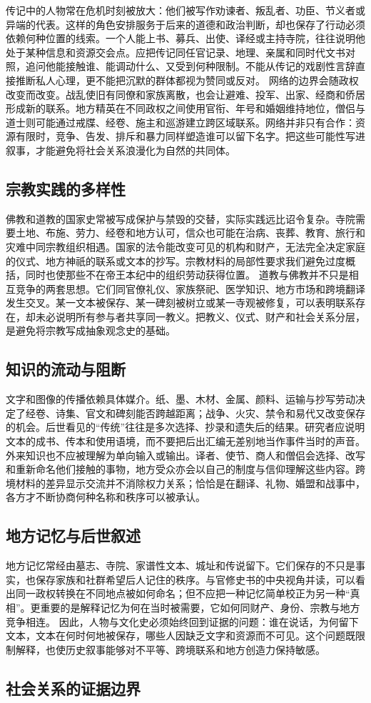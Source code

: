 传记中的人物常在危机时刻被放大：他们被写作劝谏者、叛乱者、功臣、节义者或异端的代表。这样的角色安排服务于后来的道德和政治判断，却也保存了行动必须依赖何种位置的线索。一个人能上书、募兵、出使、译经或主持寺院，往往说明他处于某种信息和资源交会点。应把传记同任官记录、地理、亲属和同时代文书对照，追问他能接触谁、能调动什么、又受到何种限制。不能从传记的戏剧性言辞直接推断私人心理，更不能把沉默的群体都视为赞同或反对。  网络的边界会随政权改变而改变。战乱使旧有同僚和家族离散，也会让避难、投军、出家、经商和侨居形成新的联系。地方精英在不同政权之间使用官衔、年号和婚姻维持地位，僧侣与道士则可能通过戒牒、经卷、施主和巡游建立跨区域联系。网络并非只有合作：资源有限时，竞争、告发、排斥和暴力同样塑造谁可以留下名字。把这些可能性写进叙事，才能避免将社会关系浪漫化为自然的共同体。  \subsection{宗教实践的多样性} 佛教和道教的国家史常被写成保护与禁毁的交替，实际实践远比诏令复杂。寺院需要土地、布施、劳力、经卷和地方认可，信众也可能在治病、丧葬、教育、旅行和灾难中同宗教组织相遇。国家的法令能改变可见的机构和财产，无法完全决定家庭的仪式、地方神祇的联系或文本的抄写。宗教材料的局部性要求我们避免过度概括，同时也使那些不在帝王本纪中的组织劳动获得位置。  道教与佛教并不只是相互竞争的两套思想。它们同官僚礼仪、家族祭祀、医学知识、地方市场和跨境翻译发生交叉。某一文本被保存、某一碑刻被树立或某一寺观被修复，可以表明联系存在，却未必说明所有参与者共享同一教义。把教义、仪式、财产和社会关系分层，是避免将宗教写成抽象观念史的基础。  \subsection{知识的流动与阻断} 文字和图像的传播依赖具体媒介。纸、墨、木材、金属、颜料、运输与抄写劳动决定了经卷、诗集、官文和碑刻能否跨越距离；战争、火灾、禁令和易代又改变保存的机会。后世看见的“传统”往往是多次选择、抄录和遗失后的结果。研究者应说明文本的成书、传本和使用语境，而不要把后出汇编无差别地当作事件当时的声音。  外来知识也不应被理解为单向输入或输出。译者、使节、商人和僧侣会选择、改写和重新命名他们接触的事物，地方受众亦会以自己的制度与信仰理解这些内容。跨境材料的差异显示交流并不消除权力关系；恰恰是在翻译、礼物、婚盟和战事中，各方才不断协商何种名称和秩序可以被承认。  \subsection{地方记忆与后世叙述} 地方记忆常经由墓志、寺院、家谱性文本、城址和传说留下。它们保存的不只是事实，也保存家族和社群希望后人记住的秩序。与官修史书的中央视角并读，可以看出同一政权转换在不同地点被如何命名；但不应把一种记忆简单校正为另一种“真相”。更重要的是解释记忆为何在当时被需要，它如何同财产、身份、宗教与地方竞争相连。  因此，人物与文化史必须始终回到证据的问题：谁在说话，为何留下文本，文本在何时何地被保存，哪些人因缺乏文字和资源而不可见。这个问题既限制解释，也使历史叙事能够对不平等、跨境联系和地方创造力保持敏感。  \subsection{社会关系的证据边界} 